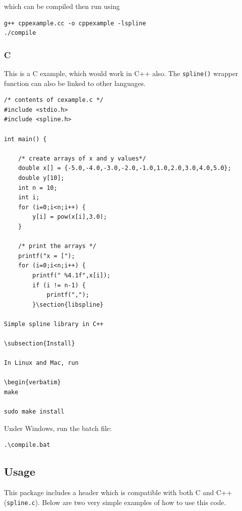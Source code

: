 which can be compiled then run using

\begin{verbatim}
g++ cppexample.cc -o cppexample -lspline
./compile
\end{verbatim}

\subsubsection{C}

This is a C example, which would work in C++ also. The \texttt{spline()} wrapper function can also be linked to other languages.

\begin{verbatim}
/* contents of cexample.c */
#include <stdio.h>
#include <spline.h>

int main() {

	/* create arrays of x and y values*/
	double x[] = {-5.0,-4.0,-3.0,-2.0,-1.0,1.0,2.0,3.0,4.0,5.0};
	double y[10];
	int n = 10;
	int i;
	for (i=0;i<n;i++) {
		y[i] = pow(x[i],3.0);
	}

	/* print the arrays */
	printf("x = [");
	for (i=0;i<n;i++) {
		printf(" %4.1f",x[i]);
		if (i != n-1) {
			printf(",");
		}\section{libspline}

Simple spline library in C++

\subsection{Install}

In Linux and Mac, run

\begin{verbatim}
make

sudo make install
\end{verbatim}

Under Windows, run the batch file:

\begin{verbatim}
.\compile.bat
\end{verbatim}

\subsection{Usage}

This package includes a header which is compatible with both C and C++ (\texttt{spline.c}). Below are two very simple examples of how to use this code.

